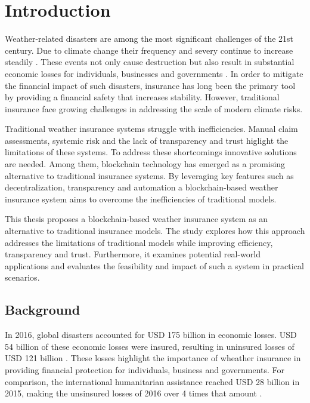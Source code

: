 \chapter{Introduction}\label{chapter:introduction} 

Weather-related disasters are among the most significant challenges of the 21st century. Due to climate change their frequency and severy continue to increase steadily \autocite{van2006impacts}. These events not only cause destruction but also result in substantial economic losses for individuals, businesses and governments \autocite{monasterolo2020climate}. In order to mitigate the financial impact of such disasters, insurance has long been the primary tool by providing a financial safety that increases stability. However, traditional insurance face growing challenges in addressing the scale of modern climate risks.

Traditional weather insurance systems struggle with inefficiencies. Manual claim assessments, systemic risk and the lack of transparency and trust higlight the limitations of these systems. To address these shortcomings innovative solutions are needed. Among them, blockchain technology has emerged as a promising alternative to traditional insurance systems. By leveraging key features such as decentralization, transparency and automation a blockchain-based weather insurance system aims to overcome the inefficiencies of traditional models. 

This thesis proposes a blockchain-based weather insurance system as an alternative to traditional insurance models. The study explores how this approach addresses the limitations of traditional models while improving efficiency, transparency and trust. Furthermore, it examines potential real-world applications and evaluates the feasibility and impact of such a system in practical scenarios.


\section{Background}\label{section:background}
In 2016, global disasters accounted for USD 175 billion in economic losses. USD 54 billion of these economic losses were insured, resulting in uninsured losses of USD 121 billion \autocite{swissre2017}. These losses highlight the importance of wheather insurance in providing financial protection for individuals, business and governments. For comparison, the international humanitarian assistance reached USD 28 billion in 2015, making the unsinsured losses of 2016 over 4 times that amount \autocite{development2016humanitarian}.

